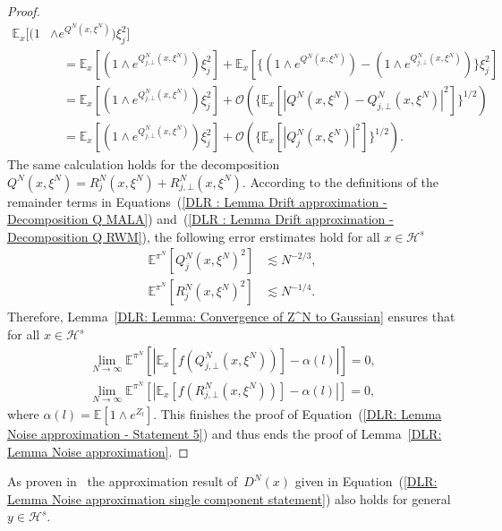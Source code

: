 \begin{proof}
  \begin{align*}
   \mathbb{E}_x[(1 & \wedge e^{Q^N(x, \xi^N)})\xi_j^2] \\
   & \quad = \mathbb{E}_x[(1 \wedge e^{Q^N_{j, \bot}(x, \xi^N)})\xi_j^2] + \mathbb{E}_x[\{ (1  \wedge e^{Q^N(x, \xi^N)}) - (1 \wedge e^{Q^N_{j, \bot}(x, \xi^N)}) \}\xi_j^2] \\
   & \quad = \mathbb{E}_x[(1 \wedge e^{Q^N_{j, \bot}(x, \xi^N)})\xi_j^2] + \mathcal{O}( \{ \mathbb{E}_x[|Q^N(x, \xi^N) -  Q^N_{j, \bot}(x, \xi^N) |^2] \}^{1/2} ) \\
   & \quad = \mathbb{E}_x[(1 \wedge e^{Q^N_{j, \bot}(x, \xi^N)})\xi_j^2] + \mathcal{O}( \{ \mathbb{E}_x[|Q^N_j(x, \xi^N) |^2] \}^{1/2} ).
  \end{align*}
  The same calculation holds for the decomposition~$Q^N(x, \xi^N) = R^N_j(x, \xi^N) + R^N_{j, \bot}(x, \xi^N)$. According to the definitions of the remainder terms in Equations~(\ref{DLR : Lemma Drift approximation - Decomposition Q MALA}) and~(\ref{DLR : Lemma Drift approximation - Decomposition Q RWM}), the following error erstimates hold for all $x \in \mathcal{H}^s$
  \begin{align*}
    \mathbb{E}^{\pi^N}[Q^N_j(x, \xi^N)^2]  & \lesssim N^{-2/3},\\
    \mathbb{E}^{\pi^N}[R^N_j(x, \xi^N)^2]  & \lesssim N^{-1/4}.
  \end{align*}
  Therefore, Lemma~\ref{DLR: Lemma: Convergence of Z^N to Gaussian} ensures that for all $x \in \mathcal{H}^s$
  \begin{equation*}
    \begin{split}
    \lim_{N \to \infty} \mathbb{E}^{\pi^N} [ | \mathbb{E}_x [f(Q^N_{j, \bot}(x, \xi^N))] - \alpha(l) | ] = 0, \\
    \lim_{N \to \infty} \mathbb{E}^{\pi^N} [ | \mathbb{E}_x [f(R^N_{j, \bot}(x, \xi^N))] - \alpha(l) | ] = 0,
    \end{split}
  \end{equation*}
  where $\alpha (l) = \mathbb{E}[ 1 \wedge e^{Z_l^{\cdot}} ]$. This finishes the proof of Equation~(\ref{DLR: Lemma Noise approximation - Statement 5}) and thus ends the proof of Lemma~\ref{DLR: Lemma Noise approximation}.
\end{proof}

As proven in~\autocite[Corollary 4.9]{Pillai2012} the approximation result of~$D^N(x)$ given in Equation~(\ref{DLR: Lemma Noise approximation single component statement}) also holds for general~$y \in \mathcal{H}^s$.

